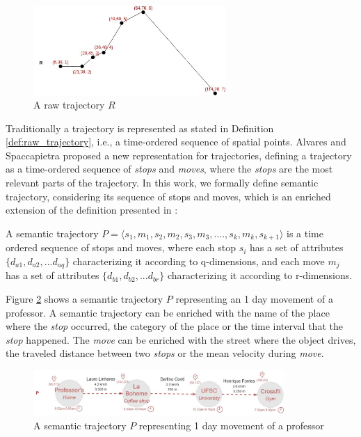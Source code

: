 \begin{figure}[h]
\centering
\includegraphics[width=0.65\textwidth]{Related_Works/Single_trajectory.jpg}
\caption{\label{fig:related_trajes}A raw trajectory $R$}
\end{figure}

Traditionally a trajectory is represented as stated in Definition \ref{def:raw_trajectory}, i.e., a time-ordered sequence of spatial points. Alvares \cite{alvares2007model} and Spaccapietra \cite{Spaccapietra:2008:CVT:1347466.1347785} proposed a new representation for trajectories, defining a trajectory as a time-ordered sequence of \emph{stops} and \emph{moves}, where the \emph{stops} are the most relevant parts of the trajectory.
In this work, we formally define semantic trajectory, considering its sequence of stops and moves, which is an enriched extension of the definition presented in \cite{Spaccapietra:2008:CVT:1347466.1347785}:

\begin{definition}
\label{def:semantic_trajectory}
A semantic trajectory  \break
$P=\langle s_1, m_1, s_2, m_2, s_3,m_3, ...., s_k, m_k, s_{k+1} \rangle$ is a time ordered sequence of stops and moves, where each stop $s_i$ has a set of attributes $\{d_{a1}, d_{a2}, ...d_{aq}\}$ characterizing it according to q-dimensions, and each move $m_j$  has a set of attributes $\{d_{b1}, d_{b2}, ...d_{br}\}$ characterizing it according to r-dimensions. 
\end{definition}

Figure \ref{fig:related_semantic_trajes} shows a semantic trajectory $P$ representing an 1 day movement of a professor. A semantic trajectory can be enriched with the name of the place where the \emph{stop} occurred, the category of the place or the time interval that the \emph{stop} happened. The \emph{move} can be enriched with the street where the object drives, the traveled distance between two \emph{stops} or the mean velocity during \emph{move}.

\begin{figure}[h]
\centering
\includegraphics[width=0.85\textwidth]{Related_Works/Single_Semantic_trajectorie.jpg}
\caption{\label{fig:related_semantic_trajes}A semantic trajectory $P$ representing 1 day movement of a professor}
\end{figure}


